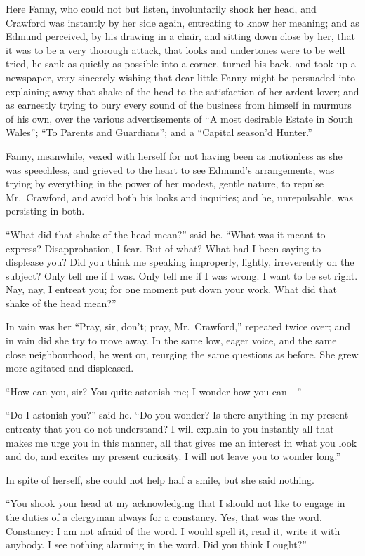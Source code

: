 \documentclass{article}
\begin{document}
Here Fanny, who could not but listen, involuntarily shook
her head, and Crawford was instantly by her side again,
entreating to know her meaning; and as Edmund perceived,
by his drawing in a chair, and sitting down close by her,
that it was to be a very thorough attack, that looks
and undertones were to be well tried, he sank as quietly
as possible into a corner, turned his back, and took up
a newspaper, very sincerely wishing that dear little
Fanny might be persuaded into explaining away that shake
of the head to the satisfaction of her ardent lover;
and as earnestly trying to bury every sound of the business
from himself in murmurs of his own, over the various
advertisements of ``A most desirable Estate in South
Wales''; ``To Parents and Guardians''; and a ``Capital
season'd Hunter.''

Fanny, meanwhile, vexed with herself for not having been
as motionless as she was speechless, and grieved to the heart
to see Edmund's arrangements, was trying by everything
in the power of her modest, gentle nature, to repulse
Mr.\ Crawford, and avoid both his looks and inquiries;
and he, unrepulsable, was persisting in both.

``What did that shake of the head mean?'' said he.  ``What was
it meant to express?  Disapprobation, I fear.  But of what?
What had I been saying to displease you?  Did you think me
speaking improperly, lightly, irreverently on the subject?
Only tell me if I was.  Only tell me if I was wrong.
I want to be set right.  Nay, nay, I entreat you;
for one moment put down your work.  What did that shake
of the head mean?''

In vain was her ``Pray, sir, don't; pray, Mr.\ Crawford,''
repeated twice over; and in vain did she try to move away.
In the same low, eager voice, and the same close neighbourhood,
he went on, reurging the same questions as before.
She grew more agitated and displeased.

``How can you, sir?  You quite astonish me; I wonder
how you can---''

``Do I astonish you?'' said he.  ``Do you wonder?  Is there
anything in my present entreaty that you do not understand?
I will explain to you instantly all that makes me urge
you in this manner, all that gives me an interest in
what you look and do, and excites my present curiosity.
I will not leave you to wonder long.''

In spite of herself, she could not help half a smile,
but she said nothing.

``You shook your head at my acknowledging that I should
not like to engage in the duties of a clergyman always
for a constancy.  Yes, that was the word.  Constancy:  I am
not afraid of the word.  I would spell it, read it,
write it with anybody.  I see nothing alarming in the word.
Did you think I ought?''
\end{document}
